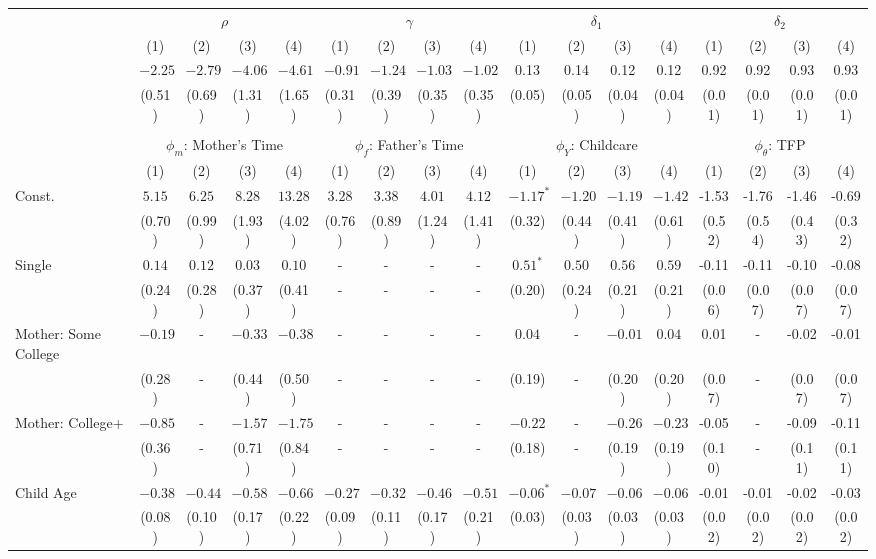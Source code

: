 \begin{tabular}{lcccccccccccccccc}\\\toprule
 & \multicolumn{4}{c}{$\rho$} & \multicolumn{4}{c}{$\gamma$} & \multicolumn{4}{c}{$\delta_{1}$} & \multicolumn{4}{c}{$\delta_{2}$} \\
&(1)&(2)&(3)&(4)&(1)&(2)&(3)&(4)&(1)&(2)&(3)&(4)&(1)&(2)&(3)&(4)\\\cmidrule(r){2-5}\cmidrule(r){6-9}\cmidrule(r){10-13}\cmidrule(r){14-17}
&$-2.25$&$-2.79$&$-4.06$&$-4.61$&$-0.91$&$-1.24$&$-1.03$&$-1.02$&0.13&0.14&0.12&0.12&0.92&0.92&0.93&0.93\\
&(0.51)&(0.69)&(1.31)&(1.65)&(0.31)&(0.39)&(0.35)&(0.35)&(0.05)&(0.05)&(0.04)&(0.04)&(0.01)&(0.01)&(0.01)&(0.01)\\
&&&&&&&&&&&&&&&&\\
 & \multicolumn{4}{c}{$\phi_{m}$: Mother's Time} & \multicolumn{4}{c}{$\phi_{f}$: Father's Time} & \multicolumn{4}{c}{$\phi_{Y}$: Childcare} & \multicolumn{4}{c}{$\phi_{\theta}$: TFP} \\
&(1)&(2)&(3)&(4)&(1)&(2)&(3)&(4)&(1)&(2)&(3)&(4)&(1)&(2)&(3)&(4)\\\cmidrule(r){2-5}\cmidrule(r){6-9}\cmidrule(r){10-13}\cmidrule(r){14-17}
Const.&$5.15$&$6.25$&$8.28$&$13.28$&$3.28$&$3.38$&$4.01$&$4.12$&$-1.17^{*}$&$-1.20$&$-1.19$&$-1.42$&-1.53&-1.76&-1.46&-0.69\\
&(0.70)&(0.99)&(1.93)&(4.02)&(0.76)&(0.89)&(1.24)&(1.41)&(0.32)&(0.44)&(0.41)&(0.61)&(0.52)&(0.54)&(0.43)&(0.32)\\
Single&$0.14$&$0.12$&$0.03$&$0.10$&-&-&-&-&$0.51^{*}$&$0.50$&$0.56$&$0.59$&-0.11&-0.11&-0.10&-0.08\\
&(0.24)&(0.28)&(0.37)&(0.41)&-&-&-&-&(0.20)&(0.24)&(0.21)&(0.21)&(0.06)&(0.07)&(0.07)&(0.07)\\
Mother: Some College&$-0.19$&-&$-0.33$&$-0.38$&-&-&-&-&$0.04$&-&$-0.01$&$0.04$&0.01&-&-0.02&-0.01\\
&(0.28)&-&(0.44)&(0.50)&-&-&-&-&(0.19)&-&(0.20)&(0.20)&(0.07)&-&(0.07)&(0.07)\\
Mother: College+&$-0.85$&-&$-1.57$&$-1.75$&-&-&-&-&$-0.22$&-&$-0.26$&$-0.23$&-0.05&-&-0.09&-0.11\\
&(0.36)&-&(0.71)&(0.84)&-&-&-&-&(0.18)&-&(0.19)&(0.19)&(0.10)&-&(0.11)&(0.11)\\
Child Age&$-0.38$&$-0.44$&$-0.58$&$-0.66$&$-0.27$&$-0.32$&$-0.46$&$-0.51$&$-0.06^{*}$&$-0.07$&$-0.06$&$-0.06$&-0.01&-0.01&-0.02&-0.03\\
&(0.08)&(0.10)&(0.17)&(0.22)&(0.09)&(0.11)&(0.17)&(0.21)&(0.03)&(0.03)&(0.03)&(0.03)&(0.02)&(0.02)&(0.02)&(0.02)\\

\end{tabular}
